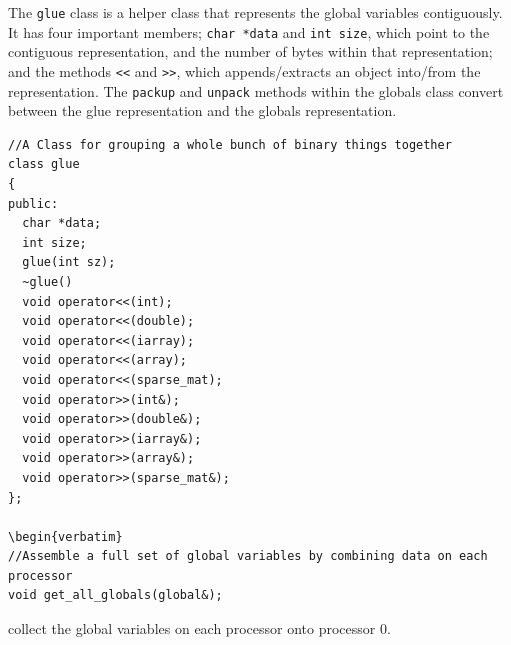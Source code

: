 The {\tt glue} class is a helper class that represents the global
variables contiguously. It has four important members; {\tt char
  *data} and {\tt int size}, which point to the contiguous
representation, and the number of bytes within that representation;
and the methods \verb|<<| and \verb|>>|, which appends/extracts an
object into/from the representation. The {\tt packup} and {\tt unpack}
methods within the globals class convert between the glue
representation and the globals representation.

\begin{verbatim}
//A Class for grouping a whole bunch of binary things together
class glue
{
public:
  char *data;
  int size;
  glue(int sz);
  ~glue()
  void operator<<(int);
  void operator<<(double);
  void operator<<(iarray);
  void operator<<(array);
  void operator<<(sparse_mat);
  void operator>>(int&);
  void operator>>(double&);
  void operator>>(iarray&);
  void operator>>(array&);
  void operator>>(sparse_mat&);
};

\begin{verbatim}
//Assemble a full set of global variables by combining data on each processor
void get_all_globals(global&);
\end{verbatim}

collect the global variables on each processor onto processor 0.
